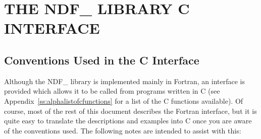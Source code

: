 \normalsize

\newpage
\section{\label{ss:cinterface}THE NDF\_ LIBRARY C INTERFACE}

\subsection{Conventions Used in the C Interface}

Although the NDF\_ library is implemented mainly in Fortran, an
interface is provided which allows it to be called from programs
written in C (see Appendix~\ref{ss:alphalistofcfunctions} for a list
of the C functions available). Of course, most of the rest of this
document describes the Fortran interface, but it is quite easy to
translate the descriptions and examples into C once you are aware of
the conventions used. The following notes are intended to assist with
this:

